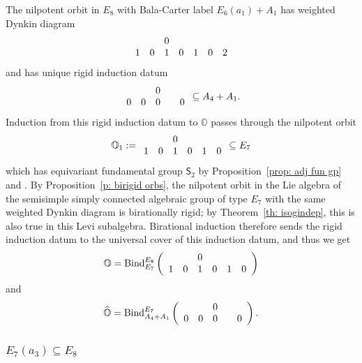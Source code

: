 \documentclass[11pt]{amsart}
\renewcommand{\O}{{\mathbb O}}
\newcommand{\Sym}{{\mathsf{S}}}
\newcommand{\BInd}{{{\mbox{\rm Bind}}}}
\newcommand{\hatO}{\widehat{\O}}
\numberwithin{equation}{section}
\begin{document}
	The nilpotent orbit in $E_8$ with Bala-Carter label $E_6(a_1)+A_1$ has weighted Dynkin diagram
	$$\begin{array}{c c c c c c c}
		& & 0 & & & & \\
		1 & 0 & 1 & 0 & 1 & 0 & 2 \\
	\end{array}$$ and has unique rigid induction datum $$\begin{array}{c c c c c}
		&  & 0 & &\\
		0 & 0 & 0 & & 0  \\
	\end{array}\subseteq A_4 + A_1.$$  Induction from this rigid induction datum to $\O$ passes through the nilpotent orbit $$\O_1:=\begin{array}{c c c c c c c}
		& & 0 & & & \\
		1 & 0 & 1 & 0 & 1 & 0 \\
	\end{array}\subseteq E_7$$ which has equivariant fundamental group $\Sym_2$ by Proposition~\ref{prop: adj fun gp} and \cite[\S 8.4]{CM}. By Proposition~\ref{p: birigid orbs}, the nilpotent orbit in the Lie algebra of the semisimple simply connected algebraic group of type $E_7$ with the same weighted Dynkin diagram is birationally rigid; by Theorem~\ref{th: isogindep}, this is also true in this Levi subalgebra. Birational induction therefore sends the rigid induction datum to the universal cover of this induction datum, and thus we get $$\O=\BInd_{E_7}^{E_8}\left(\begin{array}{c c c c c c c}
		& & 0 & & & \\
		1 & 0 & 1 & 0 & 1 & 0 \\
	\end{array}\right)$$ and $$\hatO=\BInd_{A_4 + A_1}^{E_7}\left(\begin{array}{c c c c c}
		&  & 0 & &\\
		0 & 0 & 0 & & 0  \\
	\end{array}\right).$$
	
	\subsubsection{\texorpdfstring{$E_7(a_3)\subseteq E_8$}{E7a3 in E8}}\label{sss: E7a3 in E8}
	
\end{document}
